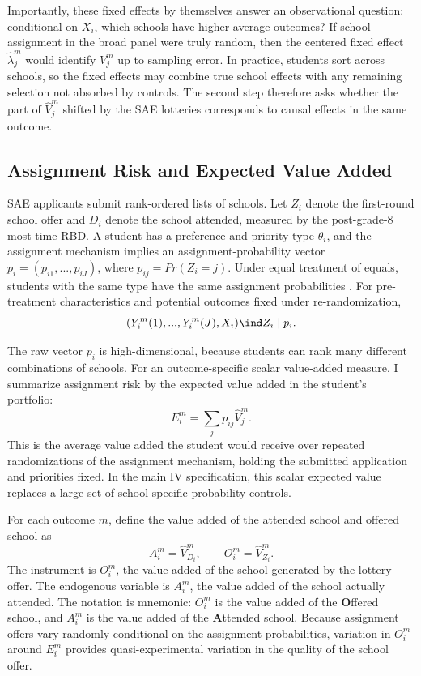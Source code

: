 \documentclass[a4paper, article, english, oneside, unknownkeysallowed, 12pt]{memoir}
\begin{document}
Importantly, these fixed effects by themselves answer an observational question: conditional on $X_i$, which schools have higher average outcomes?
If school assignment in the broad panel were truly random, then the centered fixed effect $\widehat{\lambda}_j^m$ would identify $V_j^m$ up to sampling error.
In practice, students sort across schools, so the fixed effects may combine true school effects with any remaining selection not absorbed by controls.
The second step therefore asks whether the part of $\widehat{V}_j^m$ shifted by the SAE lotteries corresponds to causal effects in the same outcome.


\subsection{Assignment Risk and Expected Value Added}

SAE applicants submit rank-ordered lists of schools.
Let $Z_i$ denote the first-round school offer and $D_i$ denote the school attended, measured by the post-grade-8 most-time RBD.
A student has a preference and priority type $\theta_i$, and the assignment mechanism implies an assignment-probability vector $p_i=(p_{i1},...,p_{iJ})$, where $p_{ij}=Pr(Z_i=j)$.
Under equal treatment of equals, students with the same type have the same assignment probabilities \parencite{abdulkadiroglu_research_2017}.
For pre-treatment characteristics and potential outcomes fixed under re-randomization,
\begin{equation}
  (Y_i^m(1),...,Y_i^m(J), X_i) \ind Z_i \mid p_i.
  \label{eq:offer-independence}
\end{equation}

The raw vector $p_i$ is high-dimensional, because students can rank many different combinations of schools.
For an outcome-specific scalar value-added measure, I summarize assignment risk by the expected value added in the student's portfolio:
\begin{equation}
  E_i^m = \sum_j p_{ij}\widehat{V}_j^m.
  \label{eq:expected-va}
\end{equation}
This is the average value added the student would receive over repeated randomizations of the assignment mechanism, holding the submitted application and priorities fixed.
In the main IV specification, this scalar expected value replaces a large set of school-specific probability controls.

For each outcome $m$, define the value added of the attended school and offered school as
\begin{equation}
  A_i^m = \widehat{V}_{D_i}^m,
  \qquad
  O_i^m = \widehat{V}_{Z_i}^m.
  \label{eq:attended-offered-va}
\end{equation}
The instrument is $O_i^m$, the value added of the school generated by the lottery offer.
The endogenous variable is $A_i^m$, the value added of the school actually attended.
The notation is mnemonic: $O_i^m$ is the value added of the \textbf{O}ffered school, and $A_i^m$ is the value added of the \textbf{A}ttended school.
Because assignment offers vary randomly conditional on the assignment probabilities, variation in $O_i^m$ around $E_i^m$ provides quasi-experimental variation in the quality of the school offer.
\end{document}
